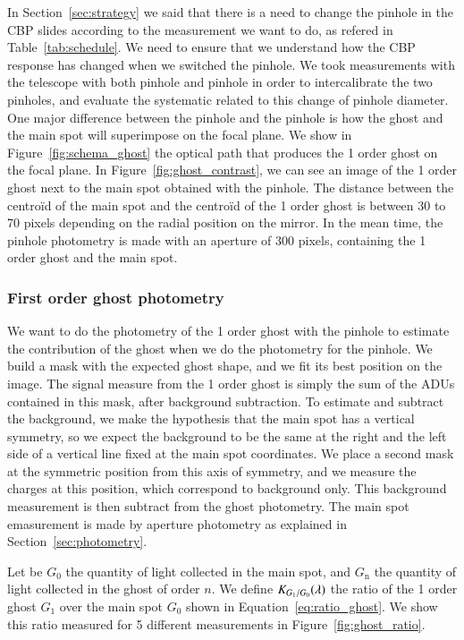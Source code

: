 In Section~\ref{sec:strategy} we said that there is a need to change the pinhole in the CBP slides according to the measurement we want to do, as refered in Table~\ref{tab:schedule}. We need to ensure that we understand how the CBP response has changed when we switched the pinhole. We took measurements with the \SD telescope with both \bpinhole pinhole and \spinhole pinhole in order to intercalibrate the two pinholes, and evaluate the systematic related to this change of pinhole diameter. One major difference between the \spinhole pinhole and the \bpinhole pinhole is how the ghost and the main spot will superimpose on the focal plane.  We show in Figure~\ref{fig:schema_ghost} the optical path that produces the 1 order ghost on the focal plane. In Figure~\ref{fig:ghost_contrast}, we can see an image of the 1 order ghost next to the main spot obtained with the \spinhole pinhole. The distance between the centroïd of the main spot and the centroïd of the 1 order ghost is between 30 to 70 pixels depending on the radial position on the mirror. In the mean time, the \bpinhole pinhole photometry is made with an aperture of 300 pixels, containing the 1 order ghost and the main spot. 

\subsubsection{First order ghost photometry}

 We want to do the photometry of the 1 order ghost with the \spinhole pinhole to estimate the contribution of the ghost when we do the photometry for the \bpinhole pinhole. We build a mask with the expected ghost shape, and we fit its best position on the image. The signal measure from the 1 order ghost is simply the sum of the ADUs contained in this mask, after background subtraction. To estimate and subtract the background, we make the hypothesis that the main spot has a vertical symmetry, so we expect the background to be the same at the right and the left side of a vertical line fixed at the main spot coordinates. We place a second mask at the symmetric position from this axis of symmetry, and we measure the charges at this position, which correspond to background only. This background measurement is then subtract from the ghost photometry. The main spot emasurement is made by aperture photometry as explained in Section~\ref{sec:photometry}. 
 
 Let be $G_0$ the quantity of light collected in the main spot, and $G_\mathrm{n}$ the quantity of light collected in the ghost of order $n$. We define $K_{G_1/G_0}(\lambda)$ the ratio of the 1 order ghost $G_1$ over the main spot $G_0$ shown in Equation~\ref{eq:ratio_ghost}. We show this ratio measured for 5 different measurements in Figure~\ref{fig:ghost_ratio}.

